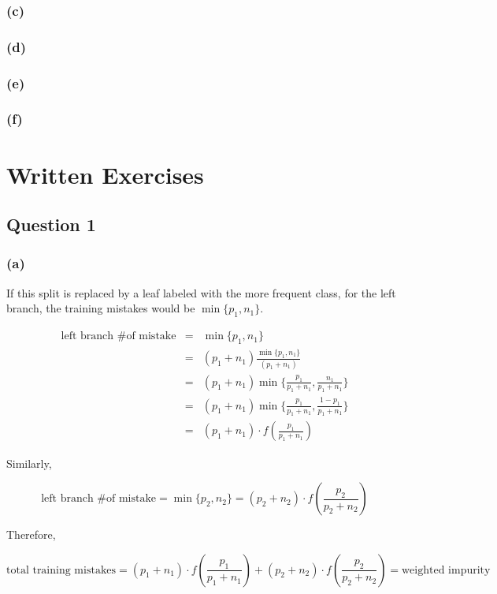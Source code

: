 \documentclass[12pt]{article}
\begin{document}
{\subsubsection*{(c)}

\subsubsection*{(d)}

\subsubsection*{(e)}

\subsubsection*{(f)}

\section*{Written Exercises}
\subsection*{Question 1}
\subsubsection*{(a)}
If this split is replaced by a leaf labeled with the more frequent class, for the left branch, the training mistakes would be $\min \lbrace p_{1}, n_{1} \rbrace $. 

\begin{eqnarray*}
\text{left branch \# of mistake} &=& \min \lbrace p_{1}, n_{1} \rbrace \\
&=& (p_{1} + n_{1}) \frac{\min \lbrace p_{1}, n_{1} \rbrace}{(p_{1} + n_{1})} \\
&=& (p_{1} + n_{1}) \min\{\frac{p_1}{p_1+n_1},\frac{n_1}{p_1+n_1}\} \\
&=& (p_{1} + n_{1}) \min\{\frac{p_1}{p_1+n_1},\frac{1-p_1}{p_1+n_1}\} \\
&=& (p_{1} + n_{1})\cdot f(\frac{p_{1}}{p_{1}+n_{1}})
\end{eqnarray*}

Similarly,

\[
\text{left branch \# of mistake} = \min \{p_{2}, n_{2}\} = (p_{2} + n_{2})\cdot f(\frac{p_{2}}{p_{2}+n_{2}})
\]

Therefore,

\[
\text{total training mistakes} = (p_{1} + n_{1})\cdot f(\frac{p_{1}}{p_{1}+n_{1}}) + (p_{2} + n_{2})\cdot f(\frac{p_{2}}{p_{2}+n_{2}}) = \text{weighted impurity}
\]

}
\end{document}
